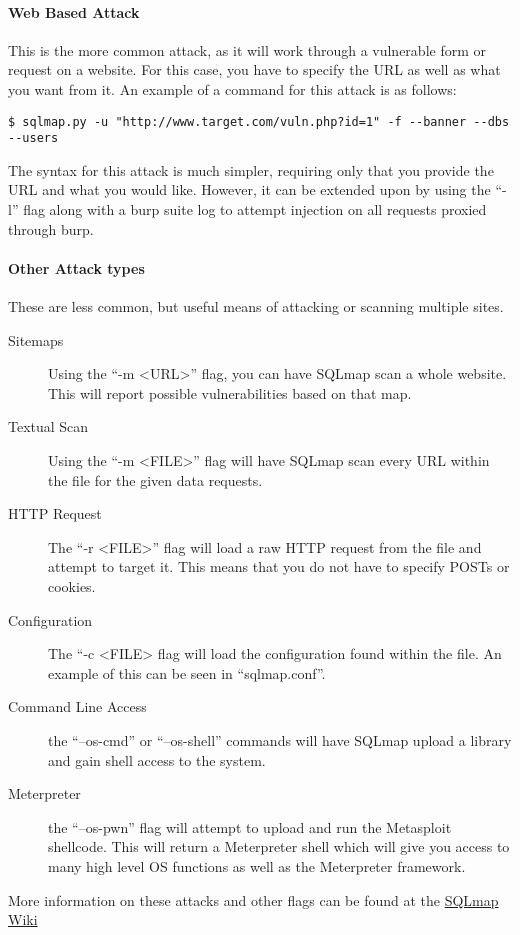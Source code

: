 			\paragraph{Web Based Attack}
				This is the more common attack, as it will work through a vulnerable form or request on a website.
				For this case, you have to specify the URL as well as what you want from it.
				An example of a command for this attack is as follows:
				\begin{lstlisting}[style=CLI]
					$ sqlmap.py -u "http://www.target.com/vuln.php?id=1" -f --banner --dbs --users
				\end{lstlisting}

				The syntax for this attack is much simpler, requiring only that you provide the URL and what you would like.
				However, it can be extended upon by using the ``-l'' flag along with a burp suite log to attempt injection on all requests proxied through burp.

			\paragraph{Other Attack types}
				These are less common, but useful means of attacking or scanning multiple sites.
				\begin{description}
					\item[Sitemaps] Using the ``-m <URL>'' flag, you can have SQLmap scan a whole website.
						This will report possible vulnerabilities based on that map.
					\item[Textual Scan] Using the ``-m <FILE>'' flag will have SQLmap scan every URL within the file for the given data requests.
					\item[HTTP Request] The ``-r <FILE>'' flag will load a raw HTTP request from the file and attempt to target it.
						This means that you do not have to specify POSTs or cookies.
					\item[Configuration] The ``-c <FILE> flag will load the configuration found within the file.
						An example of this can be seen in ``sqlmap.conf''.
					\item[Command Line Access] the ``--os-cmd'' or ``--os-shell'' commands will have SQLmap upload a library and gain shell access to the system.
					\item[Meterpreter] the ``--os-pwn'' flag will attempt to upload and run the Metasploit shellcode.
						This will return a Meterpreter shell which will give you access to many high level OS functions as well as the Meterpreter framework.
				\end{description}
				More information on these attacks and other flags can be found at the \href{https://github.com/sqlmapproject/sqlmap/wiki}{SQLmap Wiki}
